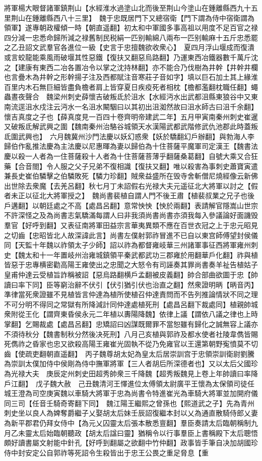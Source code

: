 將軍楊大眼督諸軍鎮荆山【水經淮水過塗山北而後至荆山今塗山在鍾離縣西九十五里荆山在鍾離縣西八十三里】　魏于忠既居門下又總宿衛【門下謂為侍中宿衛謂為領軍】遂專朝政權傾一時【朝直遥翻】初太和中軍國多事高祖以用度不足百官之禄四分減一忠悉命歸所減之禄舊制民税絹一匹别輸綿八兩布一匹别輸麻十五斤忠悉罷之乙丑詔文武羣官各進位一級【史言于忠擅魏欲收衆心】　夏四月浮山堰成而復潰或言蛟龍能乘風雨破堰其性惡鐵【復扶又翻惡烏路翻】乃運東西冶鐵器數千萬斤沈之【建康有東西二冶各置冶令以掌之沈持林翻】亦不能合乃伐樹為井幹【井幹井欄也言疊木為井幹之形幹揚子注及西都賦注音寒莊子音如字】填以巨石加土其上緣淮百里内木石無巨細皆盡負檐者肩上皆穿夏日疾疫死者相枕【檐都濫翻枕職任翻】蠅蟲晝夜聲合　魏梁州刺史薛懷吉破叛氐於沮水【水經沔水出武都沮縣東狼谷中又東南流逕沮水戍注云沔水一名沮水闞駰曰以其初出沮洳然故曰沮水師古曰沮千余翻】懷吉真度之子也【薛真度見一百四十卷齊明帝建武二年】五月甲寅南秦州刺史崔暹又破叛氐解武興之圍【魏南秦州治駱谷城領天水漢陽武都武階修武仇池郡此時蓋叛氐圍武興也】　六月魏冀州沙門法慶以妖幻惑衆【妖於驕翻幻戶辦翻】與勃海人李歸伯作亂推法慶為主法慶以尼惠暉為妻以歸伯為十住菩薩平魔軍司定漢王【魏書法慶以殺一人者為一住菩薩殺十人者為十住菩薩菩薄乎翻薩桑葛翻】自號大乘又合狂藥【合音閤】令人服之父子兄弟不復相識【復扶又翻】唯以殺害為事刺史蕭寶寅遣兼長史崔伯驎擊之伯驎敗死【驎力珍翻】賊衆益盛所在毁寺舍斬僧尼燒經像云新佛出世除去衆魔【去羌呂翻】秋七月丁未詔假右光禄大夫元遥征北大將軍以討之【假者未正以征北大將軍授之】　魏尚書裴植自謂人門不後王肅【植裴叔業之兄子也後戶遘翻】以朝廷處之不高【處昌呂翻】意常怏怏【怏於兩翻】表請解官隱嵩山世宗不許深怪之及為尚書志氣驕滿每謂人曰非我須尚書尚書亦須我每入參議論好面譏毁羣官【好呼到翻】又表征南將軍田益宗言華夷異類不應在百世衣冠之上于忠元昭見之切齒【忠昭皆北人故深諱此言】尚書左僕射郭祚冒進不已自以東宫師傅望封侯儀同【天監十年魏以祚領太子少師】詔以祚為都督雍岐華三州諸軍事征西將軍雍州刺史【魏太和十一年置岐州治雍城鎮領平秦武都武功三郡雍於用翻華戶化翻】祚與植皆惡于忠專横密勸高陽王雍使出之忠聞之大怒令有司誣奏其罪尚書奏羊祉告植姑子皇甫仲達云受植旨詐稱被詔【惡烏路翻横戶孟翻被皮義翻】帥合部曲欲圖于忠【帥讀曰率下同】臣等窮治辭不伏引【伏引猶引伏也治直之翻】然衆證明昞【昞音丙】準律當死衆證雖不見植皆言仲達為植所使植召仲達責問而不告列推論情狀不同之理不可分明不得同之常獄有所降減計同仲達處植死刑【處昌呂翻下裁處同】植親帥城衆附從王化【謂齊東昏侯永元二年植以夀陽降魏】依律上議【謂依八議之律也上時掌翻】乞賜裁處【處昌呂翻】忠矯詔曰凶謀既爾罪不當恕雖有歸化之誠無容上議亦不須待秋分【魏書制秋分然後决死刑】八月己亥植與郭祚及都水使者社陵韋儁皆賜死儁祚之昏家也忠又欲殺高陽王雍崔光固執不從乃免雍官以王還第朝野寃憤莫不切齒【使疏吏翻朝直遥翻】　丙子魏尊胡太妃為皇太后居崇訓宫于忠領崇訓衛尉劉騰為崇訓太僕加侍中侯剛為侍中撫軍將軍【三人者胡后所深德者也】又以太后父國珍為光禄大夫　庚辰定州刺史田超秀帥衆三千降魏【超秀叛魏見上卷上年帥讀曰率降戶江翻】　戊子魏大赦　己丑魏清河王懌進位太傅領太尉廣平王懷為太保領司徒任城王澄為司空庚寅魏以車騎大將軍于忠為尚書令特進崔光為車騎大將軍並加開府儀同三司【任音壬騎奇寄翻下同】　魏江陽王繼熙之曾孫也【熙道武之子】先為青州刺史坐以良人為婢奪爵繼子乂娶胡太后妹壬辰詔復繼本封以乂為通直散騎侍郎乂妻為新平郡君仍拜女侍中【為元乂囚靈太后張本散悉亶翻】羣臣奏請太后臨朝稱制九月乙未靈太后始臨朝聽政【胡太后諡曰靈】猶稱令以行事羣臣上書稱殿下太后聰悟頗好讀書屬文射能中針孔【好呼到翻屬之欲翻中竹仲翻】政事皆手筆自决加胡國珍侍中封安定公自郭祚等死詔令生殺皆出于忠王公畏之重足脅息【重
